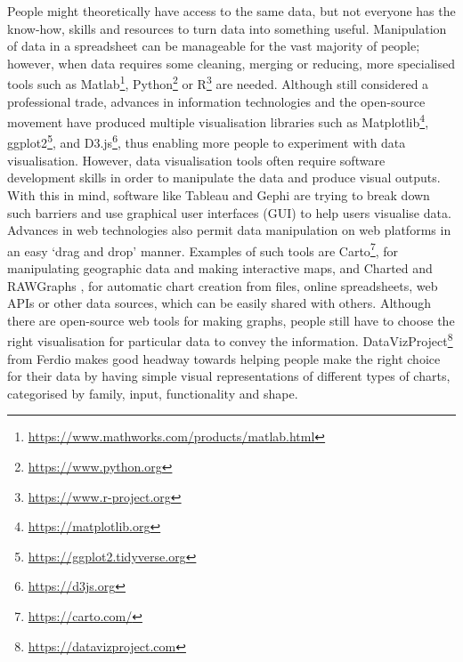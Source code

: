 People might theoretically have access to the same data, but not everyone has the know-how, skills and resources to turn data into something useful. Manipulation of data in a spreadsheet can be manageable for the vast majority of people; however, when data requires some cleaning, merging or reducing, more specialised tools such as Matlab\footnote{\url{https://www.mathworks.com/products/matlab.html}}, Python\footnote{\url{https://www.python.org}} or R\footnote{\url{https://www.r-project.org}} are needed. Although still considered a professional trade, advances in information technologies and the open-source movement have produced multiple visualisation libraries such as Matplotlib\footnote{\url{https://matplotlib.org}}, ggplot2\footnote{\url{https://ggplot2.tidyverse.org}}, and D3.js\footnote{\url{https://d3js.org}}, thus enabling more people to experiment with data visualisation. However, data visualisation tools often require software development skills in order to manipulate the data and produce visual outputs. With this in mind, software like Tableau and Gephi are trying to break down such barriers and use graphical user interfaces (GUI) to help users visualise data. Advances in web technologies also permit data manipulation on web platforms in an easy `drag and drop' manner. Examples of such tools are Carto\footnote{\url{https://carto.com/}}, for manipulating geographic data and making interactive maps, and Charted \citep{sall_using_2014} and RAWGraphs \citep{mauri_rawgraphs:_2017}, for automatic chart creation from files, online spreadsheets, web APIs or other data sources, which can be easily shared with others. Although there are open-source web tools for making graphs, people still have to choose the right visualisation for particular data to convey the information. DataVizProject\footnote{\url{https://datavizproject.com}} from Ferdio makes good headway towards helping people make the right choice for their data by having simple visual representations of different types of charts, categorised by family, input, functionality and shape.

